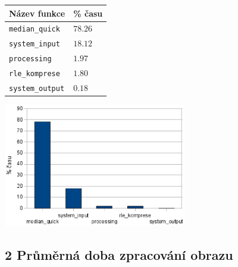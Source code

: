 \documentclass[12pt,a4paper]{article}
\begin{document}
\begin{multicols}{2}
	\noindent
	\vspace*{0.2cm}
	\begin{center}
		\begin{tabular}{| l | l |}
		\hline
		Název funkce & \% času \\
		\hline
		\texttt{median\_quick} & $78.26$ \\
		\texttt{system\_input} & $18.12$ \\
		\texttt{processing} & $1.97$ \\
		\texttt{rle\_komprese} & $1.80$ \\
		\texttt{system\_output} & $0.18$ \\
		\hline
		\end{tabular}
	\end{center}

	\noindent
	\begin{center}
		\includegraphics[width=8.0cm,keepaspectratio]{graph}
	\end{center}
\end{multicols}

\subsection*{2 Průměrná doba zpracování obrazu}
\end{document}
